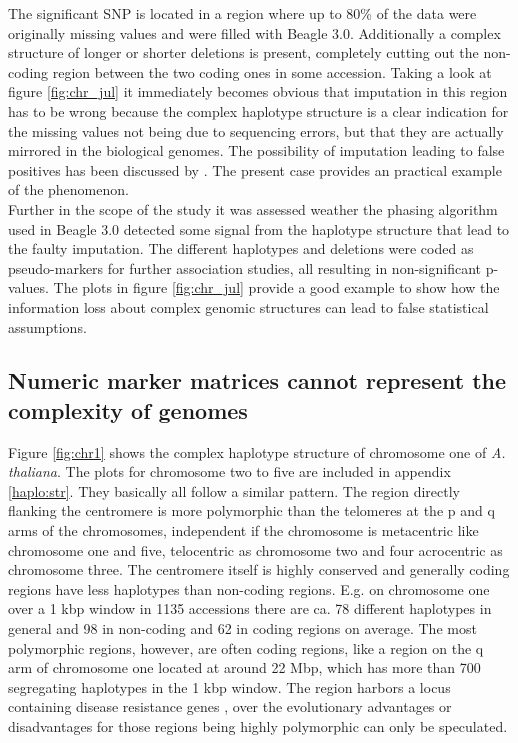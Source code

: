 The significant SNP is located in a region where up to 80\% of the data were originally
missing values and were filled with Beagle 3.0. Additionally a complex structure of longer
or shorter deletions is present, completely cutting out the non-coding region between the
two coding ones in some accession. Taking a look at figure \ref{fig:chr_jul} it immediately becomes obvious
that imputation in this region has to be wrong because the complex haplotype structure is
a clear indication for the missing values not being due to sequencing errors, but that
they are actually mirrored in the biological genomes. The possibility of imputation
leading to false positives has been discussed by \cite{lin2010new}. The present case
provides an practical example of the phenomenon. \\
Further in the scope of the study it was assessed weather the phasing algorithm used in
Beagle 3.0 detected some signal from the haplotype structure that lead to the faulty
imputation. The different haplotypes and deletions were coded as pseudo-markers for
further association studies, all resulting in non-significant p-values. The plots in
figure \ref{fig:chr_jul} provide a good example to show how the information loss about
complex genomic structures can lead to false statistical assumptions.

\subsection{Numeric marker matrices cannot represent the complexity of genomes}

Figure \ref{fig:chr1} shows the complex haplotype structure of chromosome one of
\textit{A. thaliana}. The plots for chromosome two to five are included in appendix
\ref{haplo:str}. They basically all follow a similar pattern. The region directly flanking
the centromere is more polymorphic than the telomeres at the p and q arms of the
chromosomes, independent if the chromosome is metacentric like chromosome one and five,
telocentric as chromosome two and four acrocentric as chromosome three. The centromere
itself is highly conserved and generally coding regions have less haplotypes than
non-coding regions. E.g. on chromosome one over a 1 kbp window in 1135 accessions there
are ca. 78 different haplotypes in general and 98 in non-coding and 62 in coding regions
on average. The most polymorphic regions, however, are often coding regions, like a region
on the q arm of chromosome one located at around 22 Mbp, which has more than 700
segregating haplotypes in the 1 kbp window. The region harbors a locus containing disease
resistance genes \cite{cheng2017araport11}, over the evolutionary advantages or
disadvantages for those regions being highly polymorphic can only be speculated.

